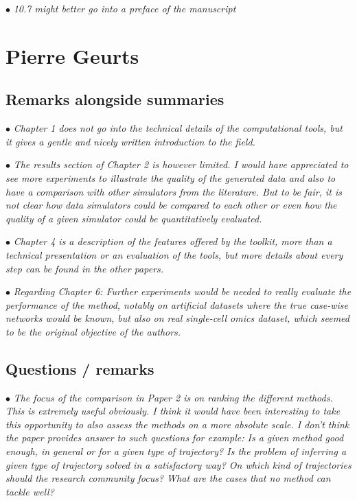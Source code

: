 \documentclass[10pt]{article}
\newcommand{\exam}[2][\  ]{\hspace{0pt}\marginpar{\color{red}#1}$\bullet$ \textit{#2}}
\newcommand{\imp}[1]{{\color{red} #1}}
\newcommand{\bigexclaim}{\raisebox{-0.1em}{\BigTriangleUp}\hspace{-0.32em}\llap{\small\textbf{!}}\hspace{0.32em}}
\newcommand{\tagimp}{\bigexclaim}
\begin{document}
{\exam{10.7 might better go into a preface of the manuscript}

\section{Pierre Geurts}

\subsection{Remarks alongside summaries}
\exam{Chapter 1 does not go into the technical details of the computational tools, but it gives a gentle and nicely written introduction to the field.}

\exam{The results
	section of Chapter 2 is however limited. I would have appreciated to see more experiments to illustrate the
	quality of the generated data and also to have a comparison with other simulators from the
	literature. But to be fair, it is not clear how data simulators could be compared to each other or
	even how the quality of a given simulator could be quantitatively evaluated.}

\exam{Chapter 4 is a description of the features offered by the toolkit, more than a technical presentation
	or an evaluation of the tools, but more details about every step can be found in the other papers.}

\exam{Regarding Chapter 6: Further experiments
	would be needed to really evaluate the performance of the method, notably on artificial datasets
	where the true case-wise networks would be known, but also on real single-cell omics dataset,
	which seemed to be the original objective of the authors.}

\subsection{Questions / remarks} 

\exam[\tagimp]{The focus of the comparison in Paper 2 is on ranking the different methods. This is extremely
	useful obviously. \imp{I think it would have been interesting to take this opportunity to also assess
	the methods on a more absolute scale.} I don’t think the paper provides answer to such
	questions for example: Is a given method good enough, in general or for a given type of
	trajectory? Is the problem of inferring a given type of trajectory solved in a satisfactory way?
	On which kind of trajectories should the research community focus? What are the cases that
	no method can tackle well?}

}
\end{document}
